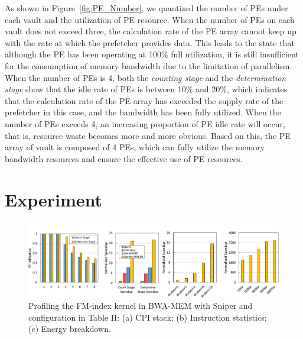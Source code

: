 \documentclass[9pt,conference]{IEEEtran}
\begin{document}
As shown in Figure~\ref{fig:PE_Number}, we quantized the number of PEs under each vault and the utilization of PE resource. When the number of PEs on each vault does not exceed three, the calculation rate of the PE array cannot keep up with the rate at which the prefetcher provides data. This leads to the state that although the PE has been operating at 100\% full utilization, it is still insufficient for the consumption of memory bandwidth due to the limitation of parallelism. When the number of PEs is 4, both the \textit{counting stage} and the \textit{determination stage} show that the idle rate of PEs is between 10\% and 20\%, which indicates that the calculation rate of the PE array has exceeded the supply rate of the prefetcher in this case, and the bandwidth has been fully utilized. When the number of PEs exceeds 4, an increasing proportion of PE idle rate will occur, that is, resource waste becomes more and more obvious. Based on this, the PE array of vault is composed of 4 PEs, which can fully utilize the memory bandwidth resources and ensure the effective use of PE resources.

\section{Experiment}
\begin{figure}[t]
\centering
\includegraphics[scale=0.55]{Conference-LaTeX-template_10-17-19/fig/result.pdf}
\caption{Profiling the FM-index kernel in BWA-MEM with Sniper and configuration in Table II: (a) CPI stack; (b) Instruction statistics; (c) Energy breakdown.}
\label{fig:data-fm}
\end{figure}
\end{document}
